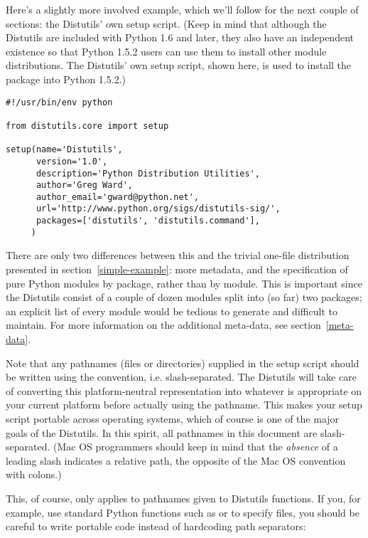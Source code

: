 \documentclass{manual}
\begin{document}
Here's a slightly more involved example, which we'll follow for the next
couple of sections: the Distutils' own setup script.  (Keep in mind that
although the Distutils are included with Python 1.6 and later, they also
have an independent existence so that Python 1.5.2 users can use them to
install other module distributions.  The Distutils' own setup script,
shown here, is used to install the package into Python 1.5.2.)

\begin{verbatim}
#!/usr/bin/env python

from distutils.core import setup

setup(name='Distutils',
      version='1.0',
      description='Python Distribution Utilities',
      author='Greg Ward',
      author_email='gward@python.net',
      url='http://www.python.org/sigs/distutils-sig/',
      packages=['distutils', 'distutils.command'],
     )
\end{verbatim}

There are only two differences between this and the trivial one-file
distribution presented in section~\ref{simple-example}: more
metadata, and the specification of pure Python modules by package,
rather than by module.  This is important since the Distutils consist of
a couple of dozen modules split into (so far) two packages; an explicit
list of every module would be tedious to generate and difficult to
maintain.  For more information on the additional meta-data, see
section~\ref{meta-data}.

Note that any pathnames (files or directories) supplied in the setup
script should be written using the \UNIX{} convention, i.e.
slash-separated.  The Distutils will take care of converting this
platform-neutral representation into whatever is appropriate on your
current platform before actually using the pathname.  This makes your
setup script portable across operating systems, which of course is one
of the major goals of the Distutils.  In this spirit, all pathnames in
this document are slash-separated.  (Mac OS programmers should keep in
mind that the \emph{absence} of a leading slash indicates a relative
path, the opposite of the Mac OS convention with colons.)

This, of course, only applies to pathnames given to Distutils
functions.  If you, for example, use standard Python functions such as
 or  to specify files, you
should be careful to write portable code instead of hardcoding path
separators:
\end{document}
